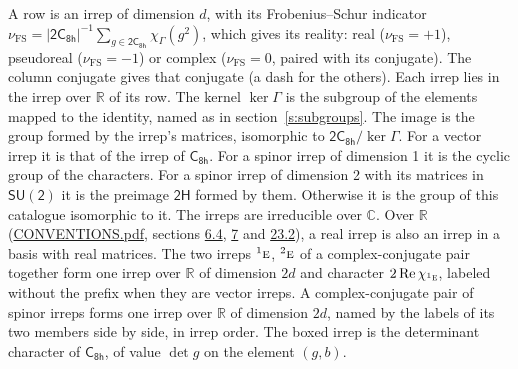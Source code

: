 \documentclass[10pt,a4paper]{article}
\numberwithin{equation}{section}
\newcommand{\grp}[1]{\mathsf{#1}}
\newcommand{\irr}[1]{\text{\normalfont\scshape #1}}
\newcommand{\conjpair}[1]{{}^{#1}}
\newcommand{\irchar}[1]{\chi_{#1}}
\newcommand{\fsind}{\nu_{\mathrm{FS}}}
\begin{document}
\leavevmode\label{n:index.frobenius}\label{n:head.irrep}\label{n:head.reality}A row is an irrep of dimension $d$, with its Frobenius--Schur indicator $\fsind = |\grp{2C_{8h}}|^{-1}\allowbreak\sum_{g\in\grp{2C_{8h}}}\irchar{\Gamma}(g^2)$, which gives its reality: real ($\fsind = +1$), pseudoreal ($\fsind = -1$) or complex ($\fsind = 0$, paired with its conjugate). \label{n:head.conjugate}The column conjugate gives that conjugate (a dash for the others). \label{n:head.over.real}Each irrep lies in the irrep over $\mathbb{R}$ of its row. \label{n:head.kernel}The kernel $\ker\Gamma$ is the subgroup of the elements mapped to the identity, named as in section~\ref{s:subgroups}. \label{n:head.image}The image is the group formed by the irrep's matrices, isomorphic to $\grp{2C_{8h}}/\ker\Gamma$. For a vector irrep it is that of the irrep of \href{../../../rotation/data/pdf/C8h.pdf}{$\grp{C_{8h}}$}. For a spinor irrep of dimension 1 it is the cyclic group of the characters. For a spinor irrep of dimension 2 with its matrices in $\grp{SU(2)}$ it is the preimage $\grp{2H}$ formed by them. Otherwise it is the group of this catalogue isomorphic to it. The irreps are irreducible over $\mathbb{C}$. Over $\mathbb{R}$ (\href{../../CONVENTIONS.pdf}{CONVENTIONS.pdf}, sections \href{../../../rotation/CONVENTIONS.pdf\#conv.6.4}{6.4}, \href{../../../rotation/CONVENTIONS.pdf\#conv.7}{7} and \href{../../CONVENTIONS.pdf\#conv.23.2}{23.2}), a real irrep is also an irrep in a basis with real matrices. The two irreps $\conjpair{1}\irr{e}$, $\conjpair{2}\irr{e}$ of a complex-conjugate pair together form one irrep over $\mathbb{R}$ of dimension $2d$ and character $2\operatorname{Re}\irchar{\conjpair{1}\irr{e}}$, labeled without the prefix when they are vector irreps. A complex-conjugate pair of spinor irreps forms one irrep over $\mathbb{R}$ of dimension $2d$, named by the labels of its two members side by side, in irrep order. \label{n:mark.determinant}The boxed irrep is the determinant character of \href{../../../rotation/data/pdf/C8h.pdf}{$\grp{C_{8h}}$}, of value $\det g$ on the element $(g, b)$.
\setlength{\emergencystretch}{2em}\par\setlength{\emergencystretch}{0pt}
\end{document}
